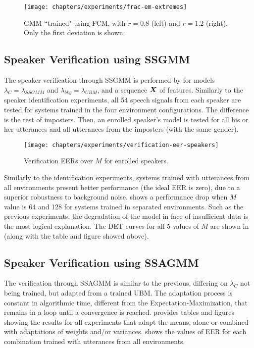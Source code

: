 \begin{figure}[ht]
    \centering
    \texttt{[image: chapters/experiments/frac-em-extremes]}
    \caption{GMM ``trained" using FCM, with $r = 0.8$ (left) and $r = 1.2$ (right). Only the first deviation is shown.}
    \label{fig:frac-em-extremes}
\end{figure}

\subsection{Speaker Verification using SSGMM}

The speaker verification through SSGMM is performed by  for models $\lambda_C = \lambda_{SSGMM}$ and $\lambda_{bkg} = \lambda_{UBM}$, and a sequence $\boldsymbol{X}$ of features. Similarly to the speaker identification experiments, all 54 speech signals from each speaker are tested for systems trained in the four environment configurations. The difference is the test of imposters. Then, an enrolled speaker's model is tested for all his or her utterances and all utterances from the imposters (with the same gender).



\begin{figure}[ht]
    \centering
    \texttt{[image: chapters/experiments/verification-eer-speakers]}
    \caption{Verification EERs over $M$ for enrolled speakers.}
    \label{fig:verification-eer-speakers}
\end{figure}

Similarly to the identification experiments, systems trained with utterances from all environments present better performance (the ideal EER is zero), due to a superior robustness to background noise.  shows a performance drop when $M$ value is 64 and 128 for systems trained in separated environments. Such as the previous experiments, the degradation of the model in face of insufficient data is the most logical explanation. The DET curves for all 5 values of $M$ are shown in  (along with the table and figure showed above).

\subsection{Speaker Verification using SSAGMM}

The verification through SSAGMM is similar to the previous, differing on $\lambda_C$ not being trained, but adapted from a trained UBM. The adaptation process is constant in algorithmic time, different from the Expectation-Maximization, that remains in a loop until a convergence is reached.  provides tables and figures showing the results for all experiments that adapt the means, alone or combined with adaptations of weights and/or variances.  shows the values of EER for each combination trained with utterances from all environments.


